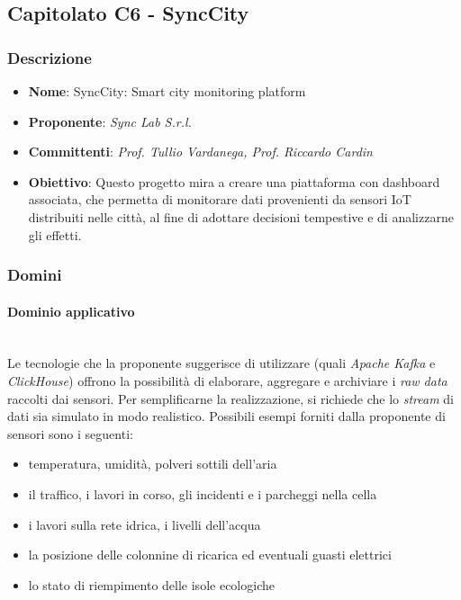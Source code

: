 \documentclass[italian,12pt]{article} %
\begin{document}
\subsection{Capitolato C6 - SyncCity}

\subsubsection{Descrizione}
\begin{itemize}
	\item \textbf{Nome}: SyncCity: Smart city monitoring platform
	\item \textbf{Proponente}: {\it Sync Lab S.r.l.}
	\item \textbf{Committenti}: {\it Prof. Tullio Vardanega, Prof. Riccardo Cardin}
	\item \textbf{Obiettivo}: Questo progetto mira a creare una piattaforma
	      con dashboard associata, che permetta di monitorare dati provenienti da sensori IoT
	      distribuiti nelle città, al fine di adottare decisioni tempestive
	      e di analizzarne gli effetti.
\end{itemize}

\subsubsection{Domini}
\paragraph{Dominio applicativo}\mbox{}\\
Le tecnologie che la proponente suggerisce di utilizzare (quali \textit{Apache Kafka} e \textit{ClickHouse}) offrono la possibilità di elaborare,
aggregare e archiviare i \textit{raw data} raccolti dai sensori.
Per semplificarne la realizzazione, si richiede che lo \textit{stream} di dati sia simulato in modo realistico.
Possibili esempi forniti dalla proponente di sensori sono i seguenti:
\begin{itemize}\itemsep0em
	\item temperatura, umidità, polveri sottili dell’aria
	\item il traffico, i lavori in corso, gli incidenti e i parcheggi nella cella
	\item i lavori sulla rete idrica, i livelli dell'acqua
	\item la posizione delle colonnine di ricarica ed eventuali guasti elettrici
	\item lo stato di riempimento delle isole ecologiche
\end{itemize}
\end{document}
